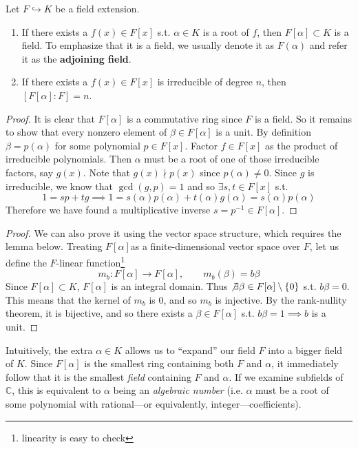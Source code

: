   \begin{theorem}
    Let $F \hookrightarrow K$ be a field extension. 
    \begin{enumerate}
      \item If there exists a $f(x) \in F[x]$ s.t. $\alpha \in K$ is a root of $f$, then $F[\alpha] \subset K$ is a field. To emphasize that it is a field, we usually denote it as $F(\alpha)$ and refer it as the \textbf{adjoining field}. 
      \item If there exists a $f(x) \in F[x]$ is irreducible of degree $n$, then $[F[\alpha]:F] = n$.
    \end{enumerate}
  \end{theorem}
  \begin{proof}
    It is clear that $F[\alpha]$ is a commutative ring since $F$ is a field. So it remains to show that every nonzero element of $\beta \in F[\alpha]$ is a unit. By definition $\beta = p(\alpha)$ for some polynomial $p \in F[x]$.  Factor $f \in F[x]$ as the product of irreducible polynomials. Then $\alpha$ must be a root of one of those irreducible factors, say $g(x)$. Note that $g(x) \nmid p(x)$ since $p(\alpha) \neq 0$. Since $g$ is irreducible, we know that $\gcd(g, p) = 1$ and so $\exists s, t \in F[x]$ s.t. 
    \begin{equation}
      1 = s p + t g \implies 1 = s(\alpha) p(\alpha) + t(\alpha) g(\alpha) = s(\alpha) p(\alpha)
    \end{equation}  
    Therefore we have found a multiplicative inverse $s = p^{-1} \in F[\alpha]$. 
  \end{proof} 
  \begin{proof}
    We can also prove it using the vector space structure, which requires the lemma below. Treating $F[\alpha]$as a finite-dimensional vector space over $F$, let us define the $F$-linear function\footnote{linearity is easy to check}
    \begin{equation}
      m_b: F[\alpha] \rightarrow F[\alpha], \qquad m_b (\beta) = b\beta
    \end{equation} 
    Since $F[\alpha] \subset K$, $F[\alpha]$ is an integral domain. Thus $\not\exists \beta \in F[\alpha] \setminus \{0\}$ s.t. $b \beta = 0$. This means that the kernel of $m_b$ is $0$, and so $m_b$ is injective. By the rank-nullity theorem, it is bijective, and so there exists a $\beta \in F[\alpha]$ s.t. $b \beta = 1 \implies b$ is a unit. 
  \end{proof} 

  Intuitively, the extra $\alpha \in K$ allows us to ``expand'' our field $F$ into a bigger field of $K$. Since $F[\alpha]$ is the smallest ring containing both $F$ and $\alpha$, it immediately follow that it is the smallest \textit{field} containing $F$ and $\alpha$. If we examine subfields of $\mathbb{C}$, this is equivalent to $\alpha$ being an \textit{algebraic number} (i.e. $\alpha$ must be a root of some polynomial with rational---or equivalently, integer---coefficients). 

